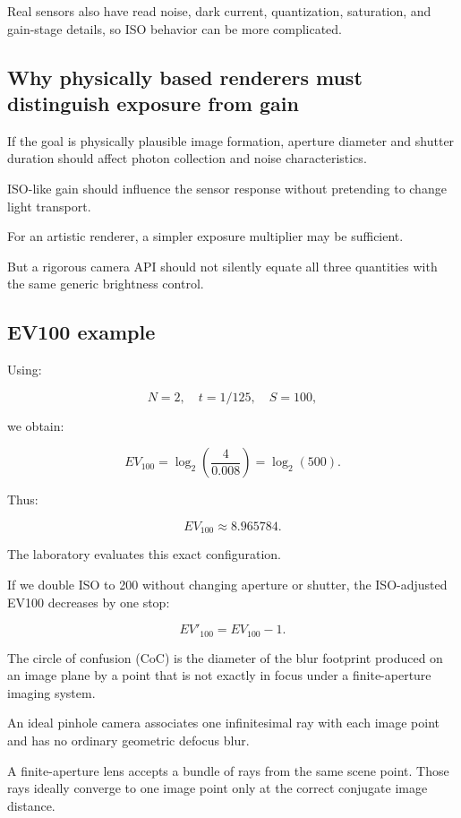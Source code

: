 Real sensors also have read noise, dark current, quantization, saturation, and gain-stage details, so ISO behavior can be more complicated.

\subsection{Why physically based renderers must distinguish exposure from gain}\label{02-foundations-ii-ch036-why-physically-based-renderers-must-distinguish-exposure-from-gain}

If the goal is physically plausible image formation, aperture diameter and shutter duration should affect photon collection and noise characteristics.

ISO-like gain should influence the sensor response without pretending to change light transport.

For an artistic renderer, a simpler exposure multiplier may be sufficient.

But a rigorous camera API should not silently equate all three quantities with the same generic brightness control.

\subsection{EV100 example}\label{02-foundations-ii-ch036-ev100-example}

Using:

\[ N=2,\quad t=1/125,\quad S=100, \]

we obtain:

\[ EV_{100} = \log_2\left(\frac4{0.008}\right) = \log_2(500). \]

Thus:

\[ \boxed{EV_{100}\approx8.965784}. \]

The laboratory evaluates this exact configuration.

If we double ISO to 200 without changing aperture or shutter, the ISO-adjusted EV100 decreases by one stop:

\[ \boxed{ EV'_{100}=EV_{100}-1. } \]

The circle of confusion (CoC) is the diameter of the blur footprint produced on an image plane by a point that is not exactly in focus under a finite-aperture imaging system.

An ideal pinhole camera associates one infinitesimal ray with each image point and has no ordinary geometric defocus blur.

A finite-aperture lens accepts a bundle of rays from the same scene point. Those rays ideally converge to one image point only at the correct conjugate image distance.

